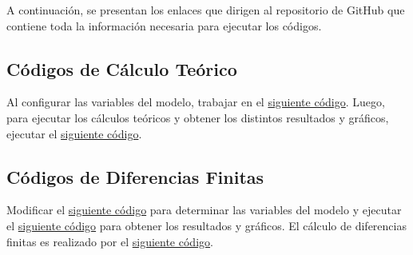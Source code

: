 A continuación, se presentan los enlaces que dirigen al repositorio de GitHub que contiene toda la información necesaria para ejecutar los códigos.

\subsection{Códigos de Cálculo Teórico}

Al configurar las variables del modelo, trabajar en el \href{https://github.com/LukasWolff2002/ENTREGA_3_MCOC/blob/main/CODIGO/CALCULOS_MANUALES/variables.py}{siguiente código}. Luego, para ejecutar los cálculos teóricos y obtener los distintos resultados y gráficos, ejecutar el \href{https://github.com/LukasWolff2002/ENTREGA_3_MCOC/blob/main/CODIGO/CALCULOS_MANUALES/main.py}{siguiente código}.

\subsection{Códigos de Diferencias Finitas}

Modificar el \href{https://github.com/LukasWolff2002/ENTREGA_3_MCOC/blob/main/CODIGO/LAPLACE/variables.py}{siguiente código} para determinar las variables del modelo y ejecutar el \href{https://github.com/LukasWolff2002/ENTREGA_3_MCOC/blob/main/CODIGO/LAPLACE/main.py}{siguiente código} para obtener los resultados y gráficos. El cálculo de diferencias finitas es realizado por el \href{https://github.com/LukasWolff2002/ENTREGA_3_MCOC/blob/main/CODIGO/LAPLACE/laplace_solver.py}{siguiente código}. 

